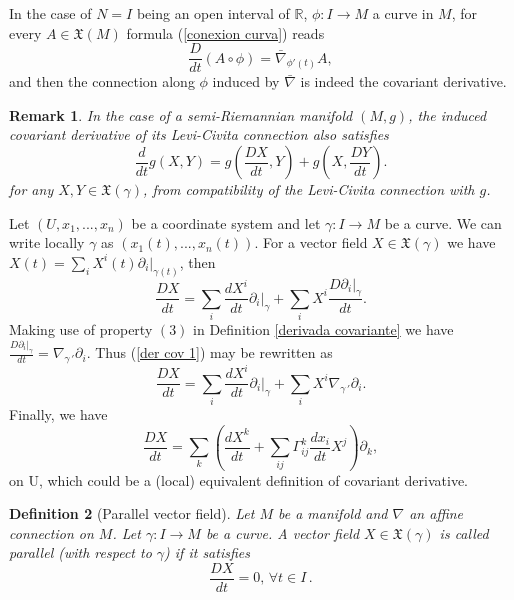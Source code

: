 \documentclass[11pt]{book}
\newtheorem{defi}{Definition}[chapter]
\newtheorem{rem}[defi]{Remark}
\def\R{\mathbb R}
\def\x{\mathfrak X}
\begin{document}
In the case of $N=I$ being an open interval of $\R$, $\phi:I\to M$ a curve in $M$, for every $A\in \x(M)$ formula (\ref{conexion curva}) reads
\begin{equation}
	\frac{D}{dt}(A\circ \phi)=\bar{\nabla}_{\phi'(t)}A,
\end{equation}
and then the connection along $\phi$ induced by $\bar{\nabla}$ is indeed the covariant derivative.

\begin{rem}
	{\rm In the case of a semi-Riemannian manifold $(M,g)$, the induced covariant derivative of its Levi-Civita connection also satisfies
		\begin{equation}\label{simetria}
			\frac{d}{dt}g(X,Y)=g\left(\frac{DX}{dt},Y\right)+ g\left(X,\frac{DY}{dt}\right).
		\end{equation}
		for any $X,Y\in \x(\gamma)$, from compatibility of the Levi-Civita connection with $g$.	
	}
\end{rem}



Let $(U,x_1,...,x_n)$ be a coordinate system and let $\gamma:I\to M$ be a curve. We can write locally $\gamma$ as $(x_1(t),...,x_n(t))$. For a vector field $X\in \x(\gamma)$ we have $X(t)=\sum_i X^i(t) \partial_i|_{\gamma(t)}$, then
\begin{equation}\label{der cov 1}
	\frac{DX}{dt}=\sum_i \frac{dX^i}{dt} \partial_i|_\gamma + \sum_i X^i \frac{D\partial_i|_\gamma}{dt}.
\end{equation}
Making use of property $(3)$ in Definition \ref{derivada covariante} we have $\frac{D\partial_i|_\gamma}{dt}=\nabla_{\gamma{\,'}} \partial_i$. Thus (\ref{der cov 1}) may be rewritten as
\begin{equation}
	\frac{DX}{dt}=\sum_i \frac{dX^i}{dt} \partial_i|_\gamma + \sum_i X^i \nabla_{\gamma{\,'}} \partial_i.
\end{equation}
Finally, we have
\begin{equation}\label{der cov}
	\frac{DX}{dt}=\sum_k \left( \frac{dX^k}{dt} + \sum_{ij} \Gamma_{ij}^k \frac{dx_i}{dt} X^j \right) \partial_k,
\end{equation}
on U, which could be a (local) equivalent definition of covariant derivative.

\begin{defi}[Parallel vector field]
	Let $M$ be a manifold and $\nabla$ an affine connection on $M$. Let $\gamma:I\to M$ be a curve. A vector field $X\in \x(\gamma)$ is called parallel (with respect to $\gamma$) if it satisfies $$\frac{DX}{dt}=0,\, \forall t \in I\,.$$
\end{defi}
\end{document}
